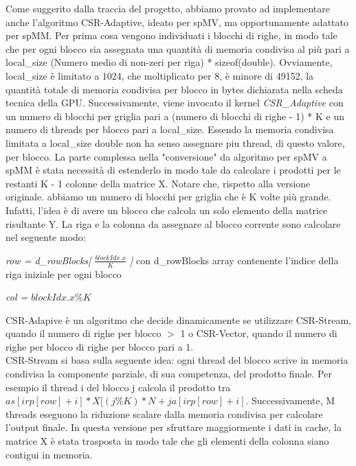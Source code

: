 \documentclass{article}
\begin{document}
Come suggerito dalla traccia del progetto, abbiamo provato ad implementare anche l'algoritmo CSR-Adaptive, ideato per spMV, ma opportunamente adattato per spMM. Per prima cosa vengono individuati i blocchi di righe, in modo tale che per ogni blocco sia assegnata una quantità di memoria condivisa al più pari a local\_size (Numero medio di non-zeri per riga) * sizeof(double). Ovviamente, local\_size è limitato a 1024, che moltiplicato per 8, è minore di 49152, la quantità totale di memoria condivisa per blocco in bytes dichiarata nella scheda tecnica della GPU. Successivamente, viene invocato il kernel \textit{CSR\_Adaptive} con un numero di blocchi per griglia pari a (numero di blocchi di righe - 1) * K e un numero di threads per blocco pari a local\_size. Essendo la memoria condivisa limitata a local\_size double non ha senso assegnare piu thread, di questo valore, per blocco. La parte complessa nella "conversione" da algoritmo per spMV a spMM è stata necessità di estenderlo in modo tale da calcolare i prodotti per le restanti K - 1 colonne della matrice X. Notare che, rispetto alla versione originale. abbiamo un numero di blocchi per griglia che è K volte più grande. Infatti, l'idea è di avere un blocco che calcola un solo elemento della matrice risultante Y. La riga e la colonna da assegnare al blocco corrente sono calcolare nel seguente modo:
    \begin{center}
    \item \textit{row = d\_rowBlocks[ $\frac{blockIdx.x} {K}$ ]} con
    d\_rowBlocks array contenente l'indice della riga iniziale per ogni blocco  
    \item \textit{col = $blockIdx.x \% K$}
    \end{center}

CSR-Adapive è un algoritmo che decide dinamicamente se utilizzare CSR-Stream, quando il numero di righe per blocco $>$ 1 o CSR-Vector, quando il numero di righe per blocco di righe per blocco pari a 1. \\
CSR-Stream si basa sulla seguente idea: ogni thread del blocco scrive in memoria condivisa la componente parziale, di sua competenza, del prodotto finale. Per esempio il thread i del blocco j calcola il prodotto tra $as[irp[row] + i] * X[(j \% K ) * N + ja[irp[row]+ i]$. Successivamente, M threads eseguono la riduzione scalare dalla memoria condivisa per calcolare l'output finale. In questa versione per sfruttare maggiormente i dati in cache, la matrice X è stata trasposta in modo tale che gli elementi della colonna siano contigui in memoria.\\
\end{document}
